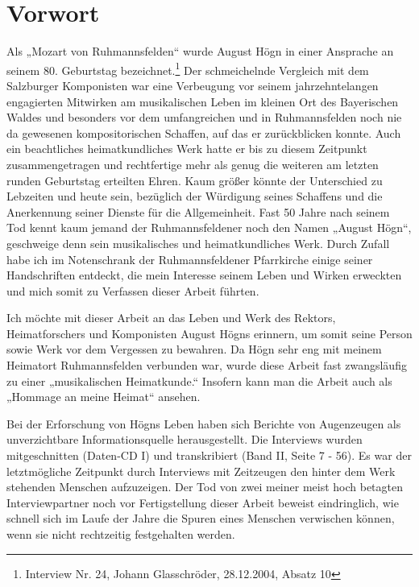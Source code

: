 \documentclass[a4paper]{article}
\begin{document}
\clearpage\setcounter{page}{1}\section{Vorwort}
\hypertarget{RefHeadingToc100333724}{}Als „Mozart von Ruhmannsfelden“
wurde August Högn in einer Ansprache an seinem 80. Geburtstag
bezeichnet.\footnote{ Interview Nr. 24, Johann Glasschröder,
28.12.2004, Absatz 10} Der schmeichelnde Vergleich mit dem Salzburger
Komponisten war eine Verbeugung vor seinem jahrzehntelangen engagierten
Mitwirken am musikalischen Leben im kleinen Ort des Bayerischen Waldes
und besonders vor dem umfangreichen und in Ruhmannsfelden noch nie da
gewesenen kompositorischen Schaffen, auf das er zurückblicken konnte.
Auch ein beachtliches heimatkundliches Werk hatte er bis zu diesem
Zeitpunkt zusammengetragen und rechtfertige mehr als genug die weiteren
am letzten runden Geburtstag erteilten Ehren. Kaum größer könnte der
Unterschied zu Lebzeiten und heute sein, bezüglich der Würdigung seines
Schaffens und die Anerkennung seiner Dienste für die Allgemeinheit.
Fast 50 Jahre nach seinem Tod kennt kaum jemand der Ruhmannsfeldener
noch den Namen „August Högn“, geschweige denn sein musikalisches und
heimatkundliches Werk. Durch Zufall habe ich im Notenschrank der
Ruhmannsfeldener Pfarrkirche einige seiner Handschriften entdeckt, die
mein Interesse seinem Leben und Wirken erweckten und mich somit zu
Verfassen dieser Arbeit führten.

Ich möchte mit dieser Arbeit an das Leben und Werk des Rektors,
Heimatforschers und Komponisten August Högns erinnern, um somit seine
Person sowie Werk vor dem Vergessen zu bewahren. Da Högn sehr eng mit
meinem Heimatort Ruhmannsfelden verbunden war, wurde diese Arbeit fast
zwangsläufig zu einer „musikalischen Heimatkunde.“ Insofern kann man
die Arbeit auch als „Hommage an meine Heimat“ ansehen.

Bei der Erforschung von Högns Leben haben sich Berichte von Augenzeugen
als unverzichtbare Informationsquelle herausgestellt. Die Interviews
wurden mitgeschnitten (Daten-CD I) und transkribiert (Band II, Seite 7
- 56). Es war der letztmögliche Zeitpunkt durch Interviews mit
Zeitzeugen den hinter dem Werk stehenden Menschen aufzuzeigen. Der Tod
von zwei meiner meist hoch betagten Interviewpartner noch vor
Fertigstellung dieser Arbeit beweist eindringlich, wie schnell sich im
Laufe der Jahre die Spuren eines Menschen verwischen können, wenn sie
nicht rechtzeitig festgehalten werden.
\end{document}
